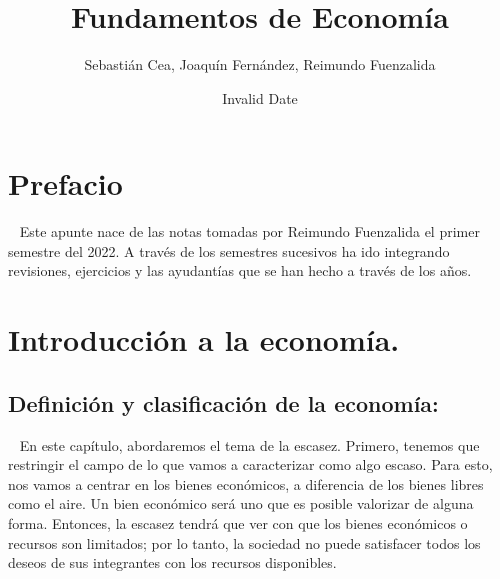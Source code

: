 \documentclass[
  letterpaper,
  DIV=11,
  numbers=noendperiod]{scrreport}
\title{Fundamentos de Economía}
\author{Sebastián Cea, Joaquín Fernández, Reimundo Fuenzalida}
\date{Invalid Date}
\renewcommand*\contentsname{Table of contents}
\newcommand\contentsname{Table of contents}
\begin{document}
\maketitle
\ifdefined\Shaded\renewenvironment{Shaded}{\begin{tcolorbox}[sharp corners, boxrule=0pt, frame hidden, interior hidden, borderline west={3pt}{0pt}{shadecolor}, enhanced, breakable]}{\end{tcolorbox}}\fi

\renewcommand*\contentsname{Table of contents}
{
\hypersetup{linkcolor=}
\setcounter{tocdepth}{2}
\tableofcontents
}

\hypertarget{prefacio}{%
\chapter*{Prefacio}\label{prefacio}}


~ Este apunte nace de las notas tomadas por Reimundo Fuenzalida el
primer semestre del 2022. A través de los semestres sucesivos ha ido
integrando revisiones, ejercicios y las ayudantías que se han hecho a
través de los años.


\hypertarget{introducciuxf3n-a-la-economuxeda.}{%
\chapter{Introducción a la
economía.}\label{introducciuxf3n-a-la-economuxeda.}}

\hypertarget{definiciuxf3n-y-clasificaciuxf3n-de-la-economuxeda}{%
\section{Definición y clasificación de la
economía:}\label{definiciuxf3n-y-clasificaciuxf3n-de-la-economuxeda}}

~ En este capítulo, abordaremos el tema de la escasez. Primero, tenemos
que restringir el campo de lo que vamos a caracterizar como algo escaso.
Para esto, nos vamos a centrar en los bienes económicos, a diferencia de
los bienes libres como el aire. Un bien económico será uno que es
posible valorizar de alguna forma. Entonces, la escasez tendrá que ver
con que los bienes económicos o recursos son limitados; por lo tanto, la
sociedad no puede satisfacer todos los deseos de sus integrantes con los
recursos disponibles.
\end{document}
